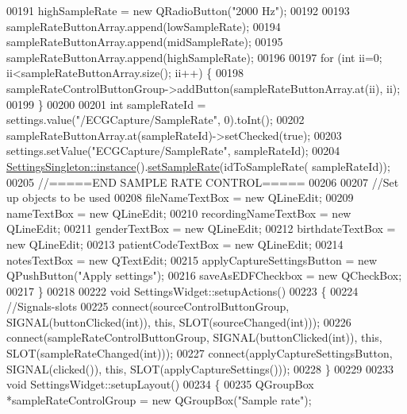 \begin{DoxyCode}
00191     highSampleRate = \textcolor{keyword}{new} QRadioButton(\textcolor{stringliteral}{"2000 Hz"});
00192 
00193     sampleRateButtonArray.append(lowSampleRate);
00194     sampleRateButtonArray.append(midSampleRate);
00195     sampleRateButtonArray.append(highSampleRate);
00196 
00197     \textcolor{keywordflow}{for} (\textcolor{keywordtype}{int} ii=0; ii<sampleRateButtonArray.size(); ii++) \{
00198         sampleRateControlButtonGroup->addButton(sampleRateButtonArray.at(ii), ii);
00199     \}
00200 
00201     \textcolor{keywordtype}{int} sampleRateId = settings.value(\textcolor{stringliteral}{"/ECGCapture/SampleRate"}, 0).toInt();
00202     sampleRateButtonArray.at(sampleRateId)->setChecked(\textcolor{keyword}{true});
00203     settings.setValue(\textcolor{stringliteral}{"ECGCapture/SampleRate"}, sampleRateId);
00204     \hyperlink{classSettingsSingleton_aad528becd7ce5903c418a5b8b718074c}{SettingsSingleton::instance}().\hyperlink{classSettingsSingleton_afb6c1555d8a9a93fab574345b7e28e28}{setSampleRate}(idToSampleRate(
      sampleRateId));
00205     \textcolor{comment}{//=====END SAMPLE RATE CONTROL=====}
00206 
00207     \textcolor{comment}{//Set up objects to be used}
00208     fileNameTextBox = \textcolor{keyword}{new} QLineEdit;
00209     nameTextBox = \textcolor{keyword}{new} QLineEdit;
00210     recordingNameTextBox = \textcolor{keyword}{new} QLineEdit;
00211     genderTextBox = \textcolor{keyword}{new} QLineEdit;
00212     birthdateTextBox = \textcolor{keyword}{new} QLineEdit;
00213     patientCodeTextBox = \textcolor{keyword}{new} QLineEdit;
00214     notesTextBox = \textcolor{keyword}{new} QTextEdit;
00215     applyCaptureSettingsButton = \textcolor{keyword}{new} QPushButton(\textcolor{stringliteral}{"Apply settings"});
00216     saveAsEDFCheckbox = \textcolor{keyword}{new} QCheckBox;
00217 \}
00218 
00222 \textcolor{keywordtype}{void} SettingsWidget::setupActions()
00223 \{
00224     \textcolor{comment}{//Signals-slots}
00225     connect(sourceControlButtonGroup, SIGNAL(buttonClicked(\textcolor{keywordtype}{int})), \textcolor{keyword}{this}, SLOT(sourceChanged(\textcolor{keywordtype}{int})));
00226     connect(sampleRateControlButtonGroup, SIGNAL(buttonClicked(\textcolor{keywordtype}{int})), \textcolor{keyword}{this}, SLOT(sampleRateChanged(\textcolor{keywordtype}{int})));
00227     connect(applyCaptureSettingsButton, SIGNAL(clicked()), \textcolor{keyword}{this}, SLOT(applyCaptureSettings()));
00228 \}
00229 
00233 \textcolor{keywordtype}{void} SettingsWidget::setupLayout()
00234 \{
00235     QGroupBox *sampleRateControlGroup = \textcolor{keyword}{new} QGroupBox(\textcolor{stringliteral}{"Sample rate"});

\end{DoxyCode}
